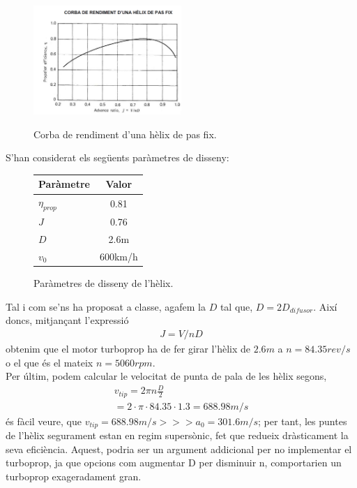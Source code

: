 \begin{figure}[H]
	\centering
	\includegraphics[width = 0.5\textwidth]{./pics/diag_helix}
	\label{diag_helix}
	\caption{Corba de rendiment d'una hèlix de pas fix.}
\end{figure}

\noindent S'han considerat els següents paràmetres de disseny:
\begin{figure}[H]
	\centering
	\begin{tabular}{lc}
		\toprule[3pt]
		\textbf{Paràmetre}&\textbf{Valor}\\
		\midrule[1pt]
		$\eta_{prop}$ & 0.81\\
		$J$ & 0.76\\
		$D$ & 2.6m\\
		$v_0$&600km/h\\
				
		\bottomrule[2pt]
	\end{tabular}
	\label{helix_param}
	\caption{Paràmetres de disseny de l'hèlix.}
\end{figure}
\noindent Tal i com se'ns ha proposat a classe, agafem la $D$ tal que, $D = 2D_{difusor}$. Així doncs, mitjançant l'expressió 
\begin{align}
	J = V/nD
\end{align}
obtenim que el motor turboprop ha de fer girar l'hèlix de $2.6m$ a \textbf{$n=84.35 rev/s$} o el que és el mateix \textbf{$n=5060rpm$}.\\

\noindent Per últim, podem calcular le velocitat de punta de pala de les hèlix segons,
\begin{multline}
	v_{tip}=2\pi n\frac{D}{2} \\
	=2\cdot\pi\cdot84.35\cdot 1.3=688.98m/s
\end{multline}
és fàcil veure, que $v_{tip}=688.98m/s >>> a_0 =  301.6m/s$; per tant, les puntes de l'hèlix segurament estan en regim supersònic, fet que redueix dràsticament la seva eficiència. Aquest, podria ser un argument addicional per no implementar el turboprop, ja que opcions com augmentar D per disminuir n, comportarien un turboprop exageradament gran.
